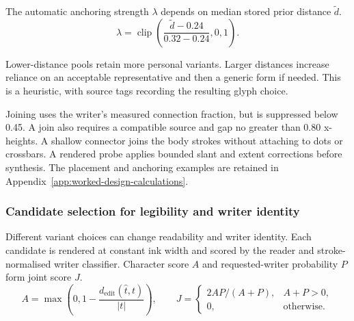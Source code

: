 The automatic anchoring strength $\lambda$ depends on median stored prior distance $\widetilde d$.
\begin{equation}
\lambda=\operatorname{clip}\left(\frac{\widetilde d-0.24}{0.32-0.24},0,1\right).
\label{eq:des-anchor}
\end{equation}

Lower-distance pools retain more personal variants. Larger distances increase reliance on an acceptable representative and then a generic form if needed. This is a heuristic, with source tags recording the resulting glyph choice.

Joining uses the writer's measured connection fraction, but is suppressed below 0.45. A join also requires a compatible source and gap no greater than 0.80 x-heights. A shallow connector joins the body strokes without attaching to dots or crossbars. A rendered probe applies bounded slant and extent corrections before synthesis. The placement and anchoring examples are retained in Appendix~\ref{app:worked-design-calculations}.

\subsubsection{Candidate selection for legibility and writer identity}
\label{sec:des-selection}
Different variant choices can change readability and writer identity. Each candidate is rendered at constant ink width and scored by the reader and stroke-normalised writer classifier. Character score $A$ and requested-writer probability $P$ form joint score $J$.
\begin{equation}
A=\max\left(0,1-\frac{d_{\mathrm{edit}}(\widehat t,t)}{|t|}\right),\qquad
J=\begin{cases}2AP/(A+P),&A+P>0,\\0,&\text{otherwise}.\end{cases}
\label{eq:des-jointscore}
\end{equation}

